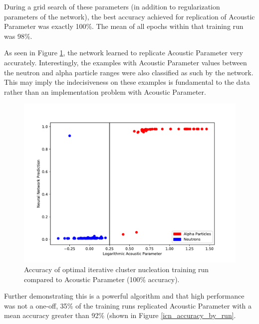 \documentclass[10pt]{article}
\begin{document}
During a grid search of these parameters (in addition to regularization parameters of the network), the best accuracy achieved for replication of Acoustic Parameter was exactly 100\%. The mean of all epochs within that training run was 98\%.

As seen in Figure \ref{icn_grid_search}, the network learned to replicate Acoustic Parameter very accurately. Interestingly, the examples with Acoustic Parameter values between the neutron and alpha particle ranges were also classified as such by the network. This may imply the indecisiveness on these examples is fundamental to the data rather than an implementation problem with Acoustic Parameter.

\begin{figure}[h]
    \centering
    \includegraphics[width=\textwidth]{icn_grid_search}
    \caption{\label{icn_grid_search} Accuracy of optimal iterative cluster nucleation training run compared to Acoustic Parameter (100\% accuracy).}
\end{figure}

Further demonstrating this is a powerful algorithm and that high performance was not a one-off, 35\% of the training runs replicated Acoustic Parameter with a mean accuracy greater than 92\% (shown in Figure \ref{icn_accuracy_by_run}.
\end{document}
